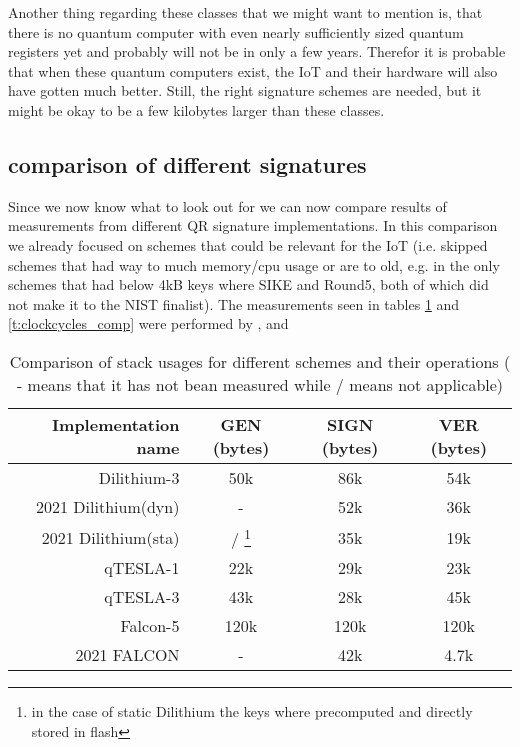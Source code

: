 \documentclass[conference]{IEEEtran}
\newcommand{\comment}[1]{}
\begin{document}
Another thing regarding these classes that we might want to mention is, that there is no quantum computer with even nearly sufficiently sized quantum registers yet and probably will not be in only a few years. Therefor it is probable that when these quantum computers exist, the IoT and their hardware will also have gotten much better. Still, the right signature schemes are needed, but it might be okay to be a few kilobytes larger than these classes.  

\subsection{comparison of different signatures}
\comment{ %
Hash-Based Sphincs promising since stateless, but many parameters to set \cite{QR_IoT_Energy}
 
as of \cite{QR_comparison} only schemes (out of ~50) with < 4kbit: SIKE and Round5 
} %

Since we now know what to look out for we can now compare results of measurements from different QR signature implementations.
In this comparison we already focused on schemes that could be relevant for the IoT (i.e. skipped schemes that had way to much memory/cpu usage or are to old, e.g. in \cite{QR_comparison} the only schemes that had below 4kB keys where SIKE and Round5, both of which did not make it to the NIST finalist).
The measurements seen in tables \ref{t:stack_comp} and \ref{t:clockcycles_comp} were performed by \cite{QR_comparison},\cite{Energy_comp} and \cite{update_sign}

\begin{table}%
    \caption{Comparison of stack usages for different schemes and their operations ( - means that it has not bean measured while / means not applicable)}
    \label{t:stack_comp}
    \centering\begin{tabular}{| r | c c c |}
        \hline
        Implementation name                     & GEN (bytes) & SIGN (bytes) & VER (bytes)\\
        \hline
        Dilithium-3 \cite{QR_Iot_Lattice}       & 50k       & 86k   & 54k\\
        2021 Dilithium(dyn)\cite{update_sign}   & -         & 52k   & 36k\\
        2021 Dilithium(sta)\cite{update_sign}   & / \footnote{in the case of static Dilithium the keys where precomputed and directly stored in flash} & 35k   & 19k\\ %
        qTESLA-1 \cite{QR_Iot_Lattice}          & 22k       & 29k   & 23k\\
        qTESLA-3 \cite{QR_Iot_Lattice}          & 43k       & 28k   & 45k\\
        Falcon-5  \cite{QR_Iot_Lattice}         & 120k      & 120k  & 120k\\
        2021 FALCON \cite{update_sign}          & -         & 42k   & 4.7k\\
        \hline
    \end{tabular}
\end{table}
\end{document}
